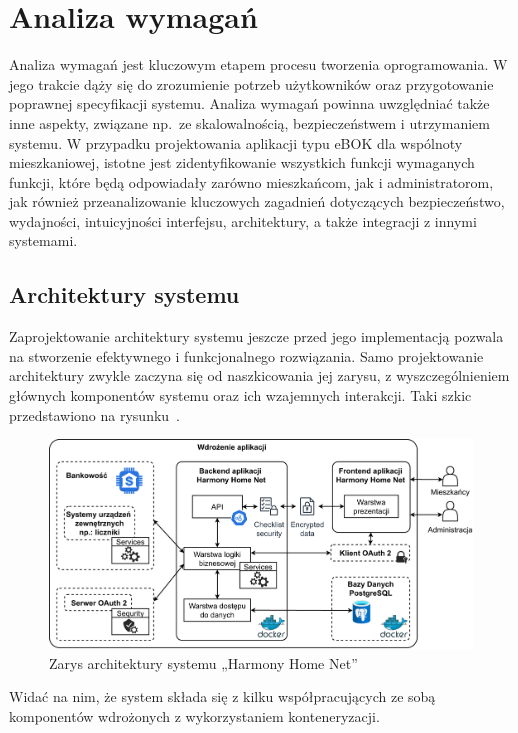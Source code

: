 \chapter{Analiza wymagań}
Analiza wymagań jest kluczowym etapem procesu tworzenia oprogramowania. W jego trakcie dąży się do zrozumienie potrzeb użytkowników oraz przygotowanie poprawnej specyfikacji systemu. Analiza wymagań powinna uwzględniać także inne aspekty, związane np.\ ze skalowalnością, bezpieczeństwem i utrzymaniem systemu. W przypadku projektowania aplikacji typu eBOK dla wspólnoty mieszkaniowej, istotne jest zidentyfikowanie wszystkich funkcji wymaganych funkcji, które będą odpowiadały zarówno mieszkańcom, jak i administratorom, jak również przeanalizowanie kluczowych zagadnień dotyczących bezpieczeństwo, wydajności, intuicyjności interfejsu, architektury, a także integracji z innymi systemami. 

\section{Architektury systemu}
Zaprojektowanie architektury systemu jeszcze przed jego implementacją pozwala na stworzenie efektywnego i funkcjonalnego rozwiązania. Samo projektowanie architektury zwykle zaczyna się od naszkicowania jej zarysu, z wyszczególnieniem głównych komponentów systemu oraz ich wzajemnych interakcji. Taki szkic przedstawiono na rysunku~\label{fig:zarys_architektury}.
\begin{figure}[ht]
    \centering
    \includegraphics[width=\linewidth]{Schematy/zarys_architektury}
    \caption{Zarys architektury systemu „Harmony Home Net”}
    \label{fig:zarys_architektury}
\end{figure}
Widać na nim, że system składa się z kilku współpracujących ze sobą komponentów wdrożonych z wykorzystaniem konteneryzacji.

